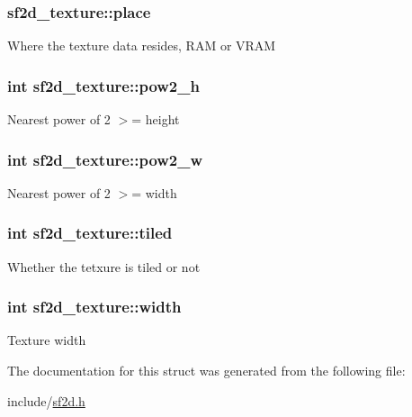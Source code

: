 \subsubsection[{place}]{ sf2d\+\_\+texture\+::place}\label{structsf2d__texture_ac30cfc2de337739d1a19858e4fdacaa4}
Where the texture data resides, R\+A\+M or V\+R\+A\+M \hypertarget{structsf2d__texture_a644c43b5fde6e12c8f1e3cb0280798e1}{}
\subsubsection[{pow2\+\_\+h}]{\setlength{\rightskip}{0pt plus 5cm}int sf2d\+\_\+texture\+::pow2\+\_\+h}\label{structsf2d__texture_a644c43b5fde6e12c8f1e3cb0280798e1}
Nearest power of 2 $>$= height \hypertarget{structsf2d__texture_aa1c5388828ad6d18ea37eb2e6ace7f48}{}
\subsubsection[{pow2\+\_\+w}]{\setlength{\rightskip}{0pt plus 5cm}int sf2d\+\_\+texture\+::pow2\+\_\+w}\label{structsf2d__texture_aa1c5388828ad6d18ea37eb2e6ace7f48}
Nearest power of 2 $>$= width \hypertarget{structsf2d__texture_a4a66a4712612cc5e3f5cdff7d0e604ec}{}
\subsubsection[{tiled}]{\setlength{\rightskip}{0pt plus 5cm}int sf2d\+\_\+texture\+::tiled}\label{structsf2d__texture_a4a66a4712612cc5e3f5cdff7d0e604ec}
Whether the tetxure is tiled or not \hypertarget{structsf2d__texture_a312abd0ee8ab587825804132c136b253}{}
\subsubsection[{width}]{\setlength{\rightskip}{0pt plus 5cm}int sf2d\+\_\+texture\+::width}\label{structsf2d__texture_a312abd0ee8ab587825804132c136b253}
Texture width 

The documentation for this struct was generated from the following file\+:\begin{DoxyCompactItemize}
\item 
include/\hyperlink{sf2d_8h}{sf2d.\+h}\end{DoxyCompactItemize}
